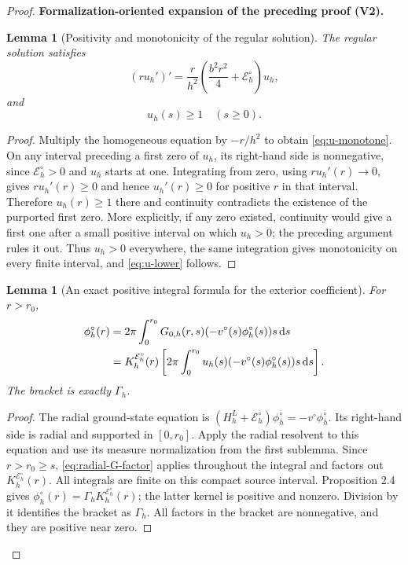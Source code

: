 \documentclass[11pt]{article}
\newtheorem{lemma}[theorem]{Lemma}
\newcommand{\formalisationparentid}{X}
\newenvironment{formalisationaddition}[1]{\par\medskip\begingroup\color{blue}\def\formalisationparentid{#1}\setcounter{formalizationsublemma}{0}\let\lemma\formalizationsublemma\let\endlemma\endformalizationsublemma
  \def\Eo{\mathcal E_h^\circ}\def\EE{\mathcal E_h}\def\phio{\phi_h^\circ}\def\phih{\phi_h}\def\Ho{H_h^{\rm atom}(v^\circ)}\def\Ha{H_h^{\rm atom}}\def\HL{H_h^{L}}\def\Dh{D_h}\def\Log{\operatorname{Log}}\def\ellh{\ell_h}\def\Gp{G_{p,h}}\def\Ast{A_{*,h}}\def\ahat{\widehat{\mathfrak a}_h}\def\ah{\mathfrak a_h}\def\rh{\widehat\rho_h}\def\deltah{\widehat\delta_h}\def\oldref##1{\textup{(##1)}}\def\interface##1{\par\noindent\textit{Analytical interface used here.} ##1\par}\def\finish{\par\noindent\textit{Conclusion of the formalization-oriented expansion.} }\par\noindent\textbf{Formalization-oriented expansion of the preceding proof (V2).}\par\smallskip
}{\par\endgroup\medskip
}
\begin{document}
\begin{proof}
\begin{formalisationaddition}{LB.2}
\begin{lemma}[Positivity and monotonicity of the regular solution]\label{sublemma:LB-2-positive}
The regular solution satisfies
\begin{equation*}
 (ru_h')'=\frac r{h^2}\left(\frac{b^2r^2}{4}+\Eo\right)u_h,
\end{equation*}
and
\begin{equation*}
 u_h(s)\ge1\quad(s\ge0).
\end{equation*}
\end{lemma}
\begin{proof}
Multiply the homogeneous equation by $-r/h^2$ to obtain \eqref{eq:u-monotone}. On any interval preceding a first zero of $u_h$, its right-hand side is nonnegative, since $\Eo>0$ and $u_h$ starts at one. Integrating from zero, using $ru_h'(r)\to0$, gives $ru_h'(r)\ge0$ and hence $u_h'(r)\ge0$ for positive $r$ in that interval. Therefore $u_h(r)\ge1$ there and continuity contradicts the existence of the purported first zero. More explicitly, if any zero existed, continuity would give a first one after a small positive interval on which $u_h>0$; the preceding argument rules it out. Thus $u_h>0$ everywhere, the same integration gives monotonicity on every finite interval, and \eqref{eq:u-lower} follows.
\end{proof}

\begin{lemma}[An exact positive integral formula for the exterior coefficient]\label{sublemma:LB-2-gamma-formula}
For $r>r_0$,
\begin{align*}
 \phio(r)
 &=2\pi\int_0^{r_0}G_{0,h}(r,s)(-v^\circ(s)\phio(s))s\,\mathrm ds\notag\\
 &=K_h^{\Eo}(r)
   \left[2\pi\int_0^{r_0}u_h(s)(-v^\circ(s)\phio(s))s\,\mathrm ds\right].
\end{align*}
The bracket is exactly $\Gamma_h$.
\end{lemma}
\begin{proof}
The radial ground-state equation is $(\HL+\Eo)\phio=-v^\circ\phio$. Its right-hand side is radial and supported in $[0,r_0]$. Apply the radial resolvent to this equation and use its measure normalization from the first sublemma. Since $r>r_0\ge s$, \eqref{eq:radial-G-factor} applies throughout the integral and factors out $K_h^{\Eo}(r)$. All integrals are finite on this compact source interval. Proposition 2.4 gives $\phio(r)=\Gamma_hK_h^{\Eo}(r)$; the latter kernel is positive and nonzero. Division by it identifies the bracket as $\Gamma_h$. All factors in the bracket are nonnegative, and they are positive near zero.
\end{proof}


\end{formalisationaddition}
\end{proof}
\end{document}
